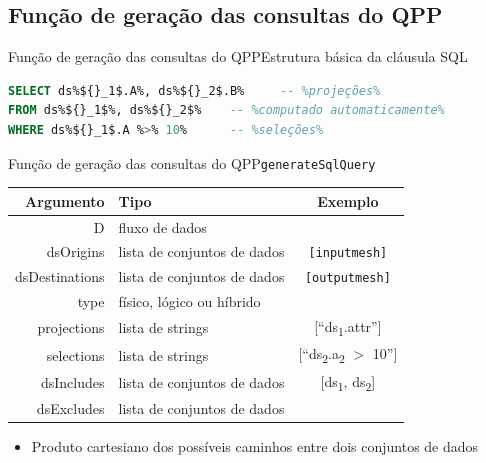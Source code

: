 \documentclass[12pt,compress,final]{beamer}
\begin{document}

\subsection*{Função de geração das consultas do QPP}

\begin{frame}[fragile]{Função de geração das consultas do QPP}{Estrutura básica da cláusula SQL}

\begin{lstlisting}[language=sql,deletendkeywords={TIME},basicstyle=\large]
SELECT ds%${}_1$.A%, ds%${}_2$.B%     -- %projeções%
FROM ds%${}_1$%, ds%${}_2$%    -- %computado automaticamente%
WHERE ds%${}_1$.A %>% 10%      -- %seleções%
\end{lstlisting}

\end{frame}


\begin{frame}[t]{Função de geração das consultas do QPP}{\texttt{generateSqlQuery}}

\vspace{-1cm}

\begin{table}
\centering
\begin{tabular}{r|l|c}
\toprule
\textbf{Argumento} & \textbf{Tipo} & \textbf{Exemplo}               \\
\midrule
D                  & fluxo de dados              \\
\alert{dsOrigins}          & lista de conjuntos de dados & \texttt{[inputmesh]} \\
\alert{dsDestinations}     & lista de conjuntos de dados & \texttt{[outputmesh]} \\
type               & físico, lógico ou híbrido   \\
projections        & lista de strings & [``ds\textsubscript{1}.attr'']             \\
selections         & lista de strings & [``ds\textsubscript{2}.a\textsubscript{2} $>$ 10'']            \\
dsIncludes         & lista de conjuntos de dados & [ds\textsubscript{1}, ds\textsubscript{2}] \\
dsExcludes         & lista de conjuntos de dados \\
\bottomrule
\end{tabular}
\end{table}

\vfill

\begin{itemize}
\item Produto cartesiano dos possíveis caminhos entre dois conjuntos de dados
\end{itemize}

\end{frame}
\end{document}
